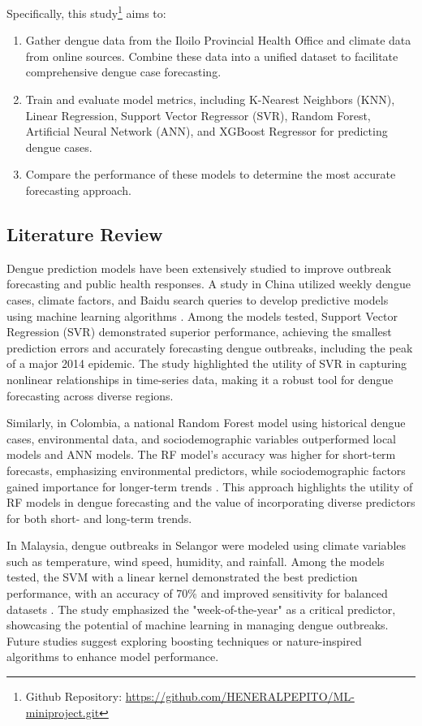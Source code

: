 \documentclass[runningheads]{llncs}
\begin{document}
Specifically, this study\footnote{Github Repository: \url{https://github.com/HENERALPEPITO/ML-miniproject.git}} aims to:
\begin{enumerate}
    \item Gather dengue data from the Iloilo Provincial Health Office and climate data from online sources. Combine these data into a unified dataset to facilitate comprehensive dengue case forecasting.
    \item Train and evaluate model metrics, including K-Nearest Neighbors (KNN), Linear Regression, Support Vector Regressor (SVR), Random Forest, Artificial Neural Network (ANN), and XGBoost Regressor for predicting dengue cases.
    \item Compare the performance of these models to determine the most accurate forecasting approach.
\end{enumerate}

\subsection{Literature Review}
Dengue prediction models have been extensively studied to improve outbreak forecasting and public health responses. A study in China utilized weekly dengue cases, climate factors, and Baidu search queries to develop predictive models using machine learning algorithms \cite{guo2017developing}. Among the models tested, Support Vector Regression (SVR) demonstrated superior performance, achieving the smallest prediction errors and accurately forecasting dengue outbreaks, including the peak of a major 2014 epidemic. The study highlighted the utility of SVR in capturing nonlinear relationships in time-series data, making it a robust tool for dengue forecasting across diverse regions.

Similarly, in Colombia, a national Random Forest model using historical dengue cases, environmental data, and sociodemographic variables outperformed local models and ANN models. The RF model's accuracy was higher for short-term forecasts, emphasizing environmental predictors, while sociodemographic factors gained importance for longer-term trends \cite{zhao2020machine}. This approach highlights the utility of RF models in dengue forecasting and the value of incorporating diverse predictors for both short- and long-term trends.

In Malaysia, dengue outbreaks in Selangor were modeled using climate variables such as temperature, wind speed, humidity, and rainfall. Among the models tested, the SVM with a linear kernel demonstrated the best prediction performance, with an accuracy of 70\% and improved sensitivity for balanced datasets \cite{salim2021prediction}. The study emphasized the "week-of-the-year" as a critical predictor, showcasing the potential of machine learning in managing dengue outbreaks. Future studies suggest exploring boosting techniques or nature-inspired algorithms to enhance model performance.
\end{document}
